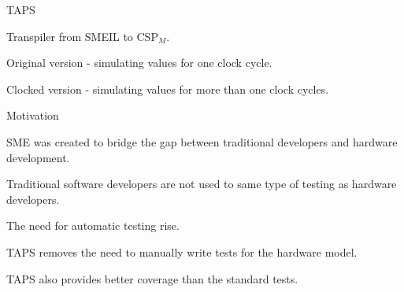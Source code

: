\documentclass[13pt]{beamer}
\newcommand{\cspm}{CSP$_M$}
\begin{document}
\begin{frame}{TAPS}
  \begin{block}{}
    Transpiler from SMEIL to \cspm.
  \end{block}

  \pause

  \begin{block}{}
     Original version - simulating values for one clock cycle.
  \end{block}

  \pause

  \begin{block}{}
     Clocked version - simulating values for more than one clock cycles.
  \end{block}
\end{frame}

\begin{frame}{Motivation}
  \begin{block}{}
    SME was created to bridge the gap between traditional developers and hardware development.
  \end{block}

  \pause

  \begin{block}{}
     Traditional software developers are not used to same type of testing as hardware developers.
  \end{block}

  \pause

  \begin{block}{}
     The need for automatic testing rise.
  \end{block}

  \pause

  \begin{block}{}
     TAPS removes the need to manually write tests for the hardware model.
  \end{block}

  \pause

  \begin{block}{}
     TAPS also provides better coverage than the standard tests.
  \end{block}
\end{frame}
\end{document}
